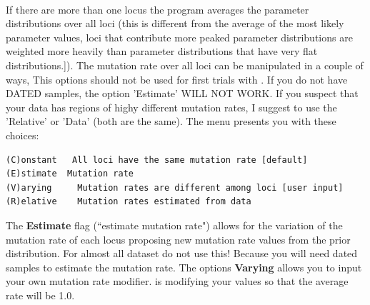 \begin{description}
\item{}\\
If there are more than one locus the program averages the parameter distributions over all loci (this is different from the average of the most likely parameter values, loci that contribute more peaked parameter distributions are weighted more heavily than parameter distributions that have very flat distributions.]).
The mutation rate over all loci can be manipulated in a couple of ways, This options should not be used for first trials with \migrate. If you do not have DATED samples, the option 'Estimate' WILL NOT WORK. If you suspect that your data has regions of highy different mutation rates, I suggest to use the 'Relative' or 'Data' (both are the same).
The menu presents you with these choices:
\begin{small}
\begin{verbatim}
(C)onstant   All loci have the same mutation rate [default]
(E)stimate  Mutation rate 
(V)arying     Mutation rates are different among loci [user input]
(R)elative    Mutation rates estimated from data
\end{verbatim}
\end{small}
%
%
 The \textbf{Estimate} flag (``estimate mutation rate") allows for the variation 
of the mutation rate of each locus proposing new mutation rate values from the prior distribution.
For almost all dataset do not use this! Because you will need dated samples to estimate the mutation rate. 
The options \textbf{ Varying} allows you to input your own mutation rate modifier. \migrate is modifying your values so that the average rate will be 1.0.


\end{description}
